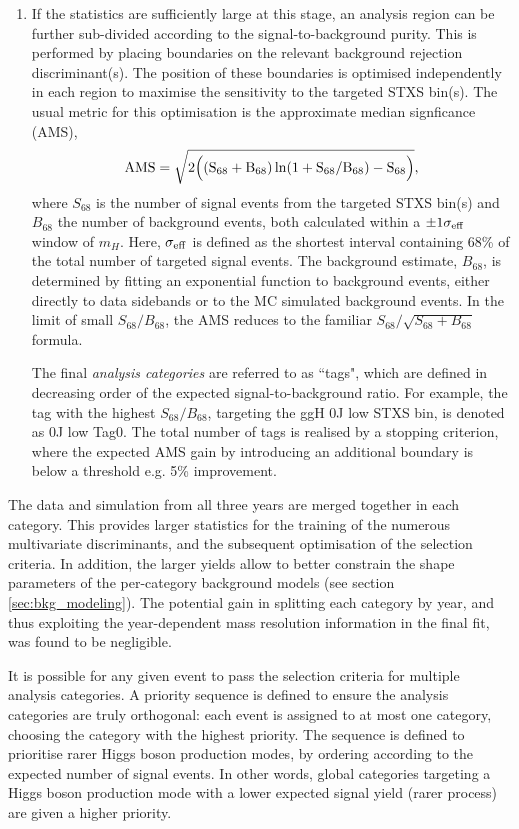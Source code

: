 \begin{enumerate}
    \item If the statistics are sufficiently large at this stage, an analysis region can be further sub-divided according to the signal-to-background purity. This is performed by placing boundaries on the relevant background rejection discriminant(s). The position of these boundaries is optimised independently in each region to maximise the sensitivity to the targeted STXS bin(s). The usual metric for this optimisation is the approximate median signficance (AMS),
    \begin{equation}
        \rm{AMS} = \sqrt{2\Big((S_{68}+B_{68})\ln(1+S_{68}/B_{68})-S_{68}\Big)},
    \end{equation}
    \noindent
    where $S_{68}$ is the number of signal events from the targeted STXS bin(s) and $B_{68}$ the number of background events, both calculated within a $\pm1\sigma_{\rm{eff}}$ window of $m_H$. Here, $\sigma_{\rm{eff}}$ is defined as the shortest interval containing 68\% of the total number of targeted signal events. The background estimate, $B_{68}$, is determined by fitting an exponential function to background events, either directly to data sidebands or to the MC simulated background events. In the limit of small $S_{68}/B_{68}$, the AMS reduces to the familiar $S_{68}/\sqrt{S_{68}+B_{68}}$ formula.
    
    The final \textit{analysis categories} are referred to as ``tags", which are defined in decreasing order of the expected signal-to-background ratio. For example, the tag with the highest $S_{68}/B_{68}$, targeting the ggH 0J low \ptH STXS bin, is denoted as 0J low \ptgg Tag0. The total number of tags is realised by a stopping criterion, where the expected AMS gain by introducing an additional boundary is below a threshold e.g. 5\% improvement.
\end{enumerate}

The data and simulation from all three years are merged together in each category. This provides larger statistics for the training of the numerous multivariate discriminants, and the subsequent optimisation of the selection criteria. In addition, the larger yields allow to better constrain the shape parameters of the per-category background models (see section \ref{sec:bkg_modeling}). The potential gain in splitting each category by year, and thus exploiting the year-dependent mass resolution information in the final fit, was found to be negligible. 

It is possible for any given event to pass the selection criteria for multiple analysis categories. A priority sequence is defined to ensure the analysis categories are truly orthogonal: each event is assigned to at most one category, choosing the category with the highest priority. The sequence is defined to prioritise rarer Higgs boson production modes, by ordering according to the expected number of signal events. In other words, global categories targeting a Higgs boson production mode with a lower expected signal yield (rarer process) are given a higher priority.

